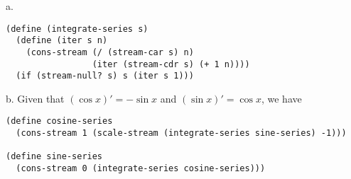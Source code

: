 \documentclass[a4paper,12pt]{article}
\newcommand{\subpar}[1]{\medskip \noindent #1.}
\begin{document}
\subpar{a}
\begin{lstlisting}
(define (integrate-series s)
  (define (iter s n)
    (cons-stream (/ (stream-car s) n)
                 (iter (stream-cdr s) (+ 1 n))))
  (if (stream-null? s) s (iter s 1)))
\end{lstlisting}

\subpar{b} Given that $(\cos x)' = -\sin x$ and $(\sin x)' = \cos x$,
we have
\begin{lstlisting}
(define cosine-series
  (cons-stream 1 (scale-stream (integrate-series sine-series) -1)))

(define sine-series
  (cons-stream 0 (integrate-series cosine-series)))
\end{lstlisting}
\end{document}
